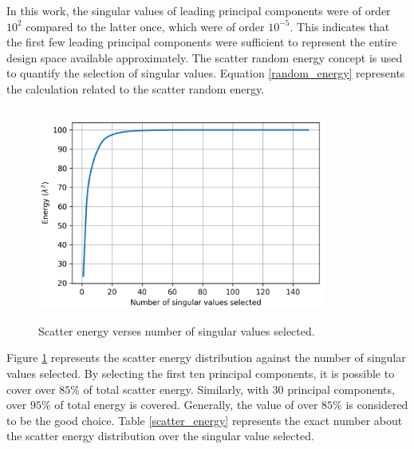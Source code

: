 In this work, the singular values of leading principal components were of order $10^2$ compared to the latter once, which were of order $10^{-5}$. This indicates that the first few leading principal components were sufficient to represent the entire design space available approximately. The scatter random energy concept is used to quantify the selection of singular values. Equation \ref{random_energy} represents the calculation related to the scatter random energy.   
\begin{figure}[!ht]
    \centering
    \includegraphics[width = 0.85\textwidth, height=70mm]{figures/energy_plot.png}
    \caption{Scatter energy verses number of singular values selected.}
    \label{energy plot}
\end{figure}

Figure \ref{energy plot} represents the scatter energy distribution against the number of singular values selected. By selecting the first ten principal components, it is possible to cover over $85\%$ of total scatter energy. Similarly, with 30 principal components, over $95\%$ of total energy is covered. Generally, the value of over $85\%$ is considered to be the good choice. Table \ref{scatter_energy} represents the exact number about the scatter energy distribution over the singular value selected.


